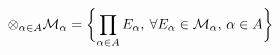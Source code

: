 \documentclass[preview, border=20pt, 12pt]{standalone}
\begin{document}
\[\otimes_{\alpha\in A}\mathcal{M}_\alpha = \biggl\{{\prod_{\alpha\in A}E_\alpha,\:\forall E_\alpha\in\mathcal{M}_\alpha,\,\alpha\in A}\biggr\}\]
\end{document}
